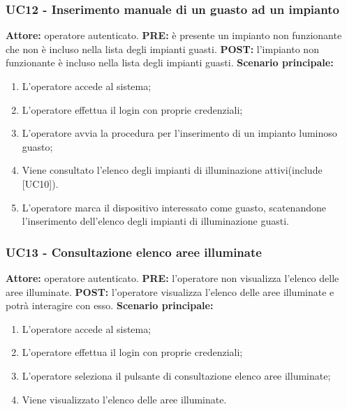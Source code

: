 \documentclass[a4paper, 12pt]{article}
\begin{document}
\subsubsection{UC12 - Inserimento manuale di un guasto ad un impianto}
\textbf{Attore:} operatore autenticato.\newline
\textbf{PRE:} è presente un impianto non funzionante che non è incluso nella lista degli impianti guasti.\newline
\textbf{POST:} l'impianto non funzionante è incluso nella lista degli impianti guasti.\newline
\textbf{Scenario principale:}
\begin{enumerate}
    \item L'operatore accede al sistema;
    \item L'operatore effettua il login con proprie credenziali;
    \item L'operatore avvia la procedura per l’inserimento di un impianto luminoso guasto;
    \item Viene consultato l’elenco degli impianti di illuminazione attivi(include [UC10]).
    \item L'operatore marca il dispositivo interessato come guasto, scatenandone l’inserimento dell’elenco degli impianti di illuminazione guasti.
\end{enumerate}

\subsubsection{UC13 - Consultazione elenco aree illuminate}
\textbf{Attore:} operatore autenticato.\newline
\textbf{PRE:} l'operatore non visualizza l'elenco delle aree illuminate.\newline
\textbf{POST:} l'operatore visualizza l'elenco delle aree illuminate e potrà interagire con esso.\newline
\textbf{Scenario principale:}
\begin{enumerate}
    \item L'operatore accede al sistema;
    \item L'operatore effettua il login con proprie credenziali;
    \item L'operatore seleziona il pulsante di consultazione elenco aree illuminate;
    \item Viene visualizzato l'elenco delle aree illuminate.
\end{enumerate}
\end{document}
